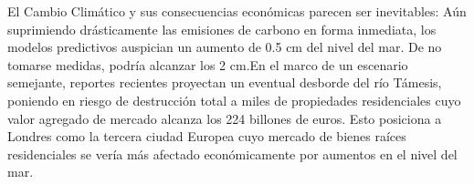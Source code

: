 \documentclass[12pt]{article}
\begin{document}
El Cambio Climático y sus consecuencias económicas parecen ser inevitables: Aún suprimiendo drásticamente las emisiones de carbono en forma inmediata, los modelos predictivos auspician un aumento de 0.5 cm del nivel del mar. De no tomarse medidas, podría alcanzar los 2 cm.\footnotemark En el marco de un escenario semejante, reportes recientes proyectan un eventual desborde del río Támesis, poniendo en riesgo de destrucción total a miles de propiedades residenciales cuyo valor agregado de mercado alcanza los 224 billones de euros. \footnotemark Esto posiciona a Londres como la tercera ciudad Europea cuyo mercado de bienes raíces residenciales se vería más afectado económicamente por aumentos en el nivel del mar. 

\end{document}
